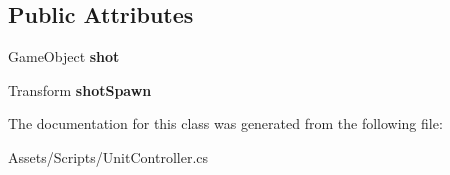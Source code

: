 \subsection*{Public Attributes}
\begin{DoxyCompactItemize}
\item 
\hypertarget{class_unit_controller_a8fb130f3cd6edb7e866cfa1053c3d524}{}Game\+Object {\bfseries shot}\label{class_unit_controller_a8fb130f3cd6edb7e866cfa1053c3d524}

\item 
\hypertarget{class_unit_controller_a24e925167637d0e1d2220d62bb9cb964}{}Transform {\bfseries shot\+Spawn}\label{class_unit_controller_a24e925167637d0e1d2220d62bb9cb964}

\end{DoxyCompactItemize}


The documentation for this class was generated from the following file\+:\begin{DoxyCompactItemize}
\item 
Assets/\+Scripts/Unit\+Controller.\+cs\end{DoxyCompactItemize}
